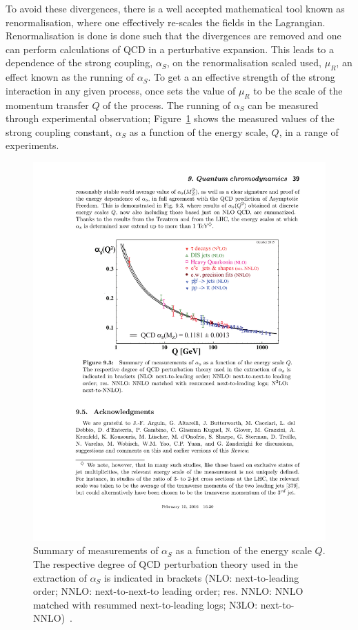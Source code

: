 To avoid these divergences, there is a well accepted mathematical tool known as renormalisation,
where one effectively re-scales the fields in the Lagrangian.
Renormalisation is done is done such that the divergences are removed
and one can perform calculations of QCD in a perturbative expansion.
This leads to a dependence of the strong coupling, $\alpha_S$, on the renormalisation scaled used, $\mu_R$,
an effect known as the running of $\alpha_S$.
To get a an effective strength of the strong interaction in any given process,
once sets the value of $\mu_R$ to be the scale of the momentum transfer $Q$ of the process.
The running of $\alpha_S$ can be measured through experimental observation;
Figure~\ref{fig:theo-qcd_running} shows the measured values of
the strong coupling constant, $\alpha_S$ as a function of the energy scale, $Q$, in a range of experiments.

\begin{figure}[!hbt]
  \begin{center}
    \includegraphics[width=0.7\linewidth, angle=0]{figs/Theory/qcd_running.pdf}
  \end{center}
  \caption[Summary of measurements of $\alpha_S$ as a function of the energy scale $Q$.
    The respective degree of QCD perturbation theory used in the extraction of $\alpha_S$ is indicated in brackets
    (NLO: next-to-leading order; NNLO: next-to-next-to leading order; res. NNLO: NNLO matched with resummed next-to-leading logs; N3LO: next-to-NNLO).]
          {Summary of measurements of $\alpha_S$ as a function of the energy scale $Q$.
            The respective degree of QCD perturbation theory used in the extraction of $\alpha_S$ is indicated in brackets
            (NLO: next-to-leading order; NNLO: next-to-next-to leading order; res. NNLO: NNLO matched with resummed next-to-leading logs; N3LO: next-to-NNLO)~\cite{theo-qcd}.}
  \label{fig:theo-qcd_running}
\end{figure}

